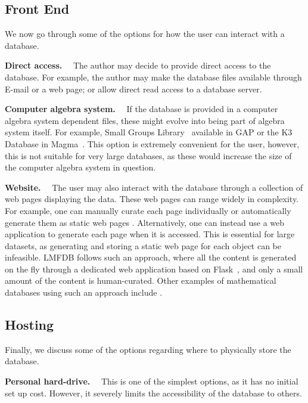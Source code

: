 \documentclass{amsart}
\newcommand{\subhead}[1]{\vspace{0.1in} \noindent \textbf{#1.}\ \ }
\begin{document}
\subsection{Front End}

We now go through some of the options for how the user can interact with a database.

\subhead{Direct access}
    The author may decide to provide direct access to the database.
    For example, the author may make the database files available through E-mail or a web page; or
    allow direct read access to a database server.

\subhead{Computer algebra system}
    If the database is provided in a computer algebra system dependent files, these might evolve into being part of algebra system itself.
    For example, Small Groups Library~\cite{smallgroups} available in GAP or the K3 Database in Magma~\cite{magmadb}.
    This option is extremely convenient for the user, however, this is not suitable for very large databases, as these would increase the size of the computer algebra system in question.

\subhead{Website}
    The user may also interact with the database through a collection of web pages displaying the data.
    These web pages can range widely in complexity.
    For example, one can manually curate each page individually \cites{cantorsattic, fanosearch} or automatically generate them as static web pages \cites{etc, graphclasses, SyzygyData, knotinfo}.
    Alternatively, one can instead use a web application to generate each page when it is accessed.
    This is essential for large datasets, as generating and storing a static web page for each object can be infeasible.
    LMFDB follows such an approach, where all the content is generated on the fly through a dedicated web application based on Flask~\cite{flask}, and only a small amount of the content is human-curated.
    Other examples of mathematical databases using such an approach include \cites{knotatlas, hog}.

\subsection{Hosting}

Finally, we discuss some of the options regarding where to physically store the database.

\subhead{Personal hard-drive}
    This is one of the simplest options, as it has no initial set up cost.
    However, it severely limits the accessibility of the database to others.
\end{document}
